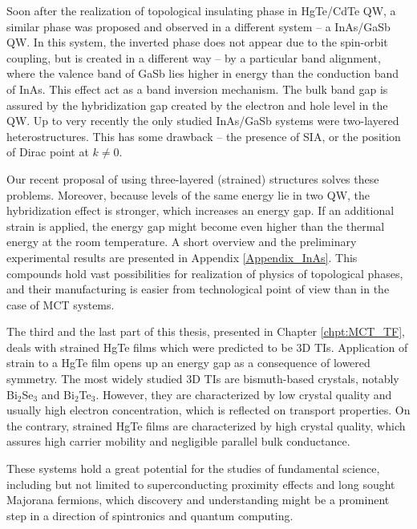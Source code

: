 \documentclass[titlepage,a4paper]{book}
\begin{document}
Soon after the realization of topological insulating phase in HgTe/CdTe QW, a similar phase was proposed and observed in a different system -- a InAs/GaSb QW. In this system, the inverted phase does not appear due to the spin-orbit coupling, but is created in a different way -- by a particular band alignment, where the valence band of GaSb lies higher in energy than the conduction band of InAs. This effect act as a band inversion mechanism. The bulk band gap is assured by the hybridization gap created by the electron and hole level in the QW. Up to very recently the only studied InAs/GaSb systems were two-layered heterostructures. This has some drawback -- the presence of SIA, or the position of Dirac point at $k \neq 0$.

Our recent proposal of using three-layered (strained) structures solves these problems. Moreover, because levels of the same energy lie in two QW, the hybridization effect is stronger, which increases an energy gap. If an additional strain is applied, the energy gap might become even higher than the thermal energy at the room temperature. A short overview and the preliminary experimental results are presented in Appendix \ref{Appendix_InAs}. This compounds hold vast possibilities for realization of physics of topological phases, and their manufacturing is easier from technological point of view than in the case of MCT systems.

The third and the last part of this thesis, presented in Chapter \ref{chpt:MCT_TF}, deals with strained HgTe films which were predicted to be 3D TIs. Application of strain to a HgTe film opens up an energy gap as a consequence of lowered symmetry. The most widely studied 3D TIs are bismuth-based crystals, notably Bi$_2$Se$_3$ and Bi$_2$Te$_3$. However, they are characterized by low crystal quality and usually high electron concentration, which is reflected on transport properties. On the contrary, strained HgTe films are characterized by high crystal quality, which assures high carrier mobility and negligible parallel bulk conductance. 

These systems hold a great potential for the studies of fundamental science, including but not limited to superconducting proximity effects and long sought Majorana fermions, which discovery and understanding might be a prominent step in a direction of spintronics and quantum computing.
\end{document}
